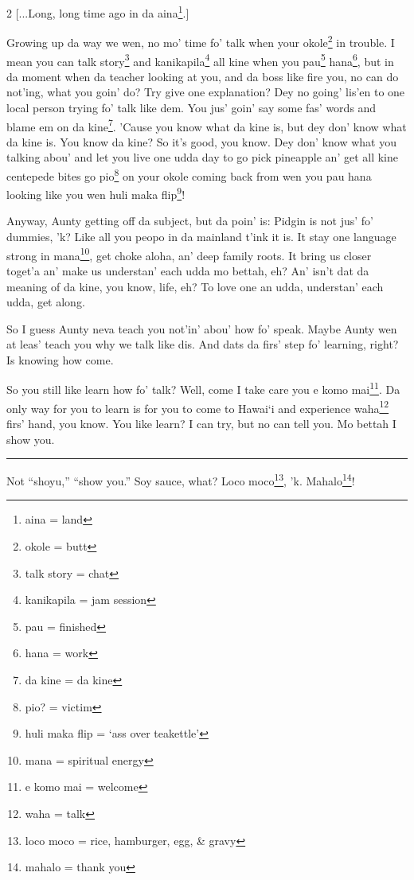 \documentclass[12pt]{article}%
\begin{document}
\begin{multicols}{2}
[...Long, long time ago in da aina\footnote{aina = land}.]

Growing up da way we wen, no mo' time fo' talk when your okole\footnote{okole = butt} in trouble. I mean you can talk story\footnote{talk story = chat} and kanikapila\footnote{kanikapila = jam session} all kine when you pau\footnote{pau = finished} hana\footnote{hana = work}, but in da moment when da teacher looking at you, and da boss like fire you, no can do not'ing, what you goin' do? Try give one explanation? Dey no going' lis'en to one local person trying fo' talk like dem. You jus' goin' say some fas' words and blame em on da kine\footnote{da kine = da kine}. 'Cause you know what da kine is, but dey don' know what da kine is. You know da kine? So it's good, you know. Dey don' know what you talking abou' and let you live one udda day to go pick pineapple an' get all kine centepede bites go pio\footnote{pio? = victim} on your okole coming back from wen you pau hana looking like you wen huli maka flip\footnote{huli maka flip = `ass over teakettle'}!

Anyway, Aunty getting off da subject, but da poin' is: Pidgin is not jus' fo' dummies, 'k? Like all you peopo in da mainland t'ink it is. It stay one language strong in mana\footnote{mana = spiritual energy}, get choke aloha, an' deep family roots. It bring us closer toget'a an' make us understan' each udda mo bettah, eh? An' isn't dat da meaning of da kine, you know, life, eh? To love one an udda, understan' each udda, get along. 

So I guess Aunty neva teach you not'in' abou' how fo' speak. Maybe Aunty wen at leas' teach you why we talk like dis. And dats da firs' step fo' learning, right? Is knowing how come. 

So you still like learn how fo' talk? Well, come I take care you e komo mai\footnote{e komo mai = welcome}. Da only way for you to learn is for you to come to Hawai`i and experience waha\footnote{waha = talk} firs' hand, you know. You like learn? I can try, but no can tell you. Mo bettah I show you.

\end{multicols}

\hrule
\vspace{5mm}

Not ``shoyu,'' ``show you.'' Soy sauce, what? Loco moco\footnote{loco moco = rice, hamburger, egg, \& gravy}, 'k. Mahalo\footnote{mahalo = thank you}!
\end{document}
